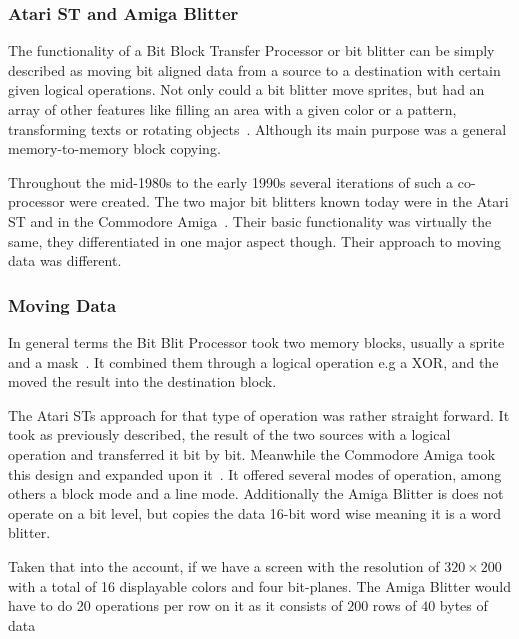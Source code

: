\subsubsection*{Atari ST and Amiga Blitter} 
The functionality of a Bit Block Transfer Processor or bit blitter can be simply described as moving bit aligned data from a source to a destination with certain given logical operations. Not only could a bit blitter move sprites, but had an array of other features like filling an area with a given color or a pattern, transforming texts or rotating objects~\cite{atari1987blit}. Although its main purpose was a general memory-to-memory block copying.

Throughout the mid-1980s to the early 1990s several iterations of such a co-processor were created. The two major bit blitters known today were in the Atari ST and in the Commodore Amiga~\cite{data1988amiga}. Their basic functionality was virtually the same, they differentiated in one major aspect though. Their approach to moving data was different.

\subsubsection*{Moving Data}
In general terms the Bit Blit Processor took two memory blocks, usually a sprite and a mask~\cite{data1988amiga}. It combined them through a logical operation e.g a XOR, and the moved the result into the destination block.

The Atari STs approach for that type of operation was rather straight forward. It took as previously described, the result of the two sources with a logical operation and transferred it bit by bit. Meanwhile the Commodore Amiga took this design and expanded upon it~\cite{amigaBlitter}. It offered several modes of operation, among others a block mode and a line mode. Additionally the Amiga Blitter is does not operate on a bit level, but copies the data 16-bit word wise meaning it is a word blitter.

Taken that into the account, if we have a screen with the resolution of \(320 \times 200\) with a total of 16 displayable colors and four bit-planes. The Amiga Blitter would have to do 20 operations per row on it as it consists of \(200\) rows of \(40\) bytes of data   

